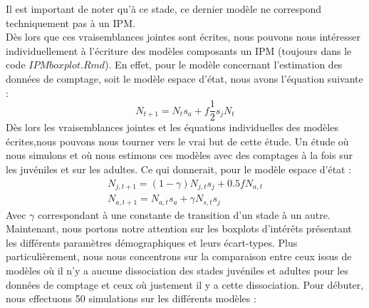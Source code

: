 \documentclass[12pt,a4paper]{article}
\begin{document}
Il est important de noter qu'à ce stade, ce dernier modèle ne correspond techniquement pas à un IPM.\\
Dès lors que ces vraisemblances jointes sont écrites, nous pouvons nous intéresser individuellement à l'écriture des modèles composants un IPM (toujours dans le code $IPMboxplot.Rmd$). En effet, pour le modèle concernant l'estimation des données de comptage, soit le modèle espace d'état, nous avons l'équation suivante : 
\begin{equation}
N_{t+1}=N_{t}s_{a}+f\dfrac{1}{2}s_{j}N_t
\end{equation}
Dès lors les vraisemblances jointes et les équations individuelles des modèles écrites,nous pouvons nous tourner vers le vrai but de cette étude. Un étude où nous simulons et où nous estimons ces modèles avec des comptages à la fois sur les juvéniles et sur les adultes.
Ce qui donnerait, pour le modèle espace d'état : 
\begin{equation}
\begin{aligned}
   N_{j, t+1} = (1-\gamma)N_{j, t}s_{j}+0.5fN_{a, t}\\
   N_{a, t+1} = N_{a, t}s_{a}+ \gamma N_{s, t}s_j
\end{aligned}
\end{equation}
Avec $\gamma$ correspondant à une constante de transition d'un stade à un autre.\\

Maintenant, nous portons notre attention sur les boxplots d'intérêts présentant les différents paramètres démographiques et leurs écart-types.  Plus particulièrement, nous nous concentrons sur la comparaison entre ceux issus de modèles où il n'y a aucune dissociation des stades juvéniles et adultes pour les données de comptage et ceux où justement il y a cette dissociation. Pour débuter, nous effectuons 50 simulations sur les différents modèles :
\end{document}
